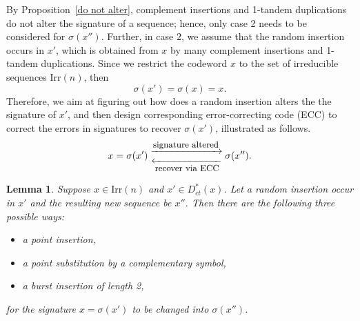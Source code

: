 \documentclass[pdflatex,sn-mathphys-num]{sn-jnl}
\theoremstyle{theorem}%
\newtheorem{lemma}{Lemma}
\theoremstyle{definition}
\theoremstyle{construction}
\newtheorem{open problem}{Open problem}
\begin{document}
By Proposition~\ref{do not alter}, complement insertions and 1-tandem duplications do not alter the signature of a sequence; hence, only case 2 needs to be considered for $\sigma(x'')$. Further, in case $2$, we assume that the random insertion occurs in $x'$, which is obtained from $x$ by many complement insertions and 1-tandem duplications. Since we restrict the codeword $x$ to the set of irreducible sequences $\mathrm{Irr}(n)$, then $$\sigma(x')=\sigma(x)=x.$$
 Therefore, we aim at figuring out how does a random insertion alters the the signature of $x'$, and then design corresponding error-correcting code (ECC) to correct the errors in signatures to recover $\sigma(x')$, illustrated as follows.
$$x=\sigma(x')
\mathrel{
	\substack{
		\xrightarrow{\text{\fontsize{9}{10}\selectfont signature altered}} \\[0.5ex]
		\xleftarrow[\text{\fontsize{9}{10}\selectfont recover via ECC}]{\hspace{2em}}
	}
}
\sigma(x'').$$
\begin{lemma}\label{a noisy alter}
Suppose $x\in \mathrm{Irr}(n)$ and $x'\in D_{ct}^{*}(x)$. Let a random insertion occur in $x'$ and the resulting new sequence be $x''$. Then there are the following three possible ways:
\begin{itemize}
	\item[(i)] a point insertion,
	\item[(ii)] a point substitution by a complementary symbol,
	\item [(iii)] a burst insertion of length 2,
\end{itemize}
for the signature $x=\sigma(x')$ to be changed into $\sigma(x'')$.
\end{lemma}
\end{document}
